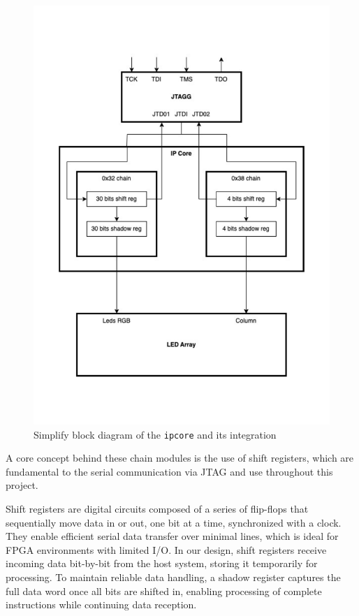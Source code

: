 \documentclass[a4paper,11pt,oneside]{report}
\begin{document}
\begin{figure}
    \centering
    \includegraphics[width=0.85\linewidth]{figures/IPCORE_Design.pdf}
    \caption{Simplify block diagram of the \texttt{ipcore} and its integration}
    \label{fig:ipcore_block}
\end{figure}

A core concept behind these chain modules is the use of shift registers, which are fundamental to the serial communication via JTAG and use throughout this project.

Shift registers are digital circuits composed of a series of flip-flops that sequentially move data in or out, one bit at a time, synchronized with a clock.  
They enable efficient serial data transfer over minimal lines, which is ideal for FPGA environments with limited I/O.  
In our design, shift registers receive incoming data bit-by-bit from the host system, storing it temporarily for processing.  
To maintain reliable data handling, a shadow register captures the full data word once all bits are shifted in, enabling processing of complete instructions while continuing data reception.
  
\end{document}
